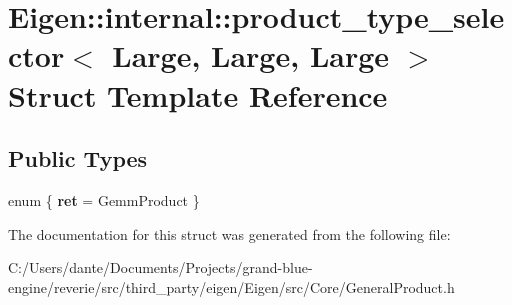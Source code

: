 \hypertarget{struct_eigen_1_1internal_1_1product__type__selector_3_01_large_00_01_large_00_01_large_01_4}{}\section{Eigen\+::internal\+::product\+\_\+type\+\_\+selector$<$ Large, Large, Large $>$ Struct Template Reference}
\label{struct_eigen_1_1internal_1_1product__type__selector_3_01_large_00_01_large_00_01_large_01_4}
\subsection*{Public Types}
\begin{DoxyCompactItemize}
\item 
\mbox{\label{struct_eigen_1_1internal_1_1product__type__selector_3_01_large_00_01_large_00_01_large_01_4_a25c8ddbceb4feba707416c34dcc77f4c}} 
enum \{ {\bfseries ret} = Gemm\+Product
 \}
\end{DoxyCompactItemize}


The documentation for this struct was generated from the following file\+:\begin{DoxyCompactItemize}
\item 
C\+:/\+Users/dante/\+Documents/\+Projects/grand-\/blue-\/engine/reverie/src/third\+\_\+party/eigen/\+Eigen/src/\+Core/General\+Product.\+h\end{DoxyCompactItemize}
